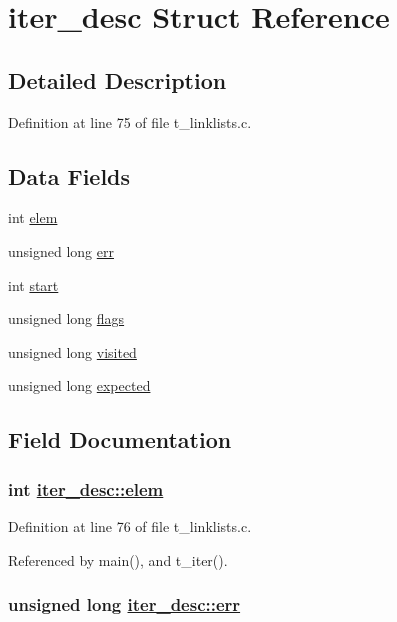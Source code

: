 \hypertarget{structiter__desc}{
\section{iter\_\-desc Struct Reference}
\label{structiter__desc}
}


\subsection{Detailed Description}




Definition at line 75 of file t\_\-linklists.c.\subsection*{Data Fields}
\begin{CompactItemize}
\item 
int \hyperlink{structiter__desc_o0}{elem}
\item 
unsigned long \hyperlink{structiter__desc_o1}{err}
\item 
int \hyperlink{structiter__desc_o2}{start}
\item 
unsigned long \hyperlink{structiter__desc_o3}{flags}
\item 
unsigned long \hyperlink{structiter__desc_o4}{visited}
\item 
unsigned long \hyperlink{structiter__desc_o5}{expected}
\end{CompactItemize}


\subsection{Field Documentation}
\hypertarget{structiter__desc_o0}{
\subsubsection[elem]{\setlength{\rightskip}{0pt plus 5cm}int \hyperlink{structiter__desc_o0}{iter\_\-desc::elem}}}
\label{structiter__desc_o0}




Definition at line 76 of file t\_\-linklists.c.

Referenced by main(), and t\_\-iter().\hypertarget{structiter__desc_o1}{
\subsubsection[err]{\setlength{\rightskip}{0pt plus 5cm}unsigned long \hyperlink{structiter__desc_o1}{iter\_\-desc::err}}}
\label{structiter__desc_o1}




